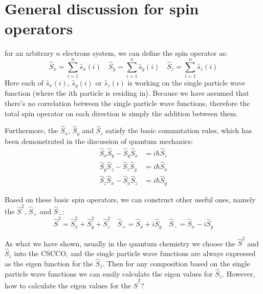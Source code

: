 \section{General discussion for spin operators}
%
%
%
for an arbitrary $n$ electrons system, we can define the spin
operator as:
\begin{equation}
  \hat{S}_{x} = \sum_{i=1}^{n}\hat{s}_{x}(i) \quad
  \hat{S}_{y} = \sum_{i=1}^{n}\hat{s}_{y}(i) \quad
  \hat{S}_{z} = \sum_{i=1}^{n}\hat{s}_{z}(i)
\end{equation}
Here each of $\hat{s}_{x}(i)$, $\hat{s}_{y}(i)$ or $\hat{s}_{z}(i)$
is working on the single particle wave function (where the ith
particle is residing in). Because we have assumed that there's no
correlation between the single particle wave functions, therefore
the total spin operator on each direction is simply the addition
between them.

Furthermore, the $\hat{S}_{x}$, $\hat{S}_{y}$ and $\hat{S}_{z}$
satisfy the basic commutation rules, which has been demonstrated in
the discussion of quantum mechanics:
\begin{align}\label{}
\hat{S}_{x}\hat{S}_{y} - \hat{S}_{y}\hat{S}_{x} &= i\hbar\hat{S}_{z}
\nonumber \\
\hat{S}_{y}\hat{S}_{z} - \hat{S}_{z}\hat{S}_{y} &= i\hbar\hat{S}_{x}
\nonumber \\
\hat{S}_{z}\hat{S}_{x} - \hat{S}_{x}\hat{S}_{z} &= i\hbar\hat{S}_{y}
\end{align}

Based on these basic spin operators, we can construct other useful
ones, namely the $\hat{S}^{2}$, $\hat{S}_{+}$ and $\hat{S}_{-}$:
\begin{equation}\label{}
\hat{S}^{2} = \hat{S}_{x}^{2} + \hat{S}_{y}^{2} + \hat{S}_{z}^{2}
\quad
\hat{S}_{+} = \hat{S}_{x} + i\hat{S}_{y} \quad
\hat{S}_{-}
=\hat{S}_{x} - i\hat{S}_{y}
\end{equation}

As what we have shown, usually in the quantum chemistry we choose
the $\hat{S}^{2}$ and $\hat{S}_{z}$ into the CSCCO, and the single
particle wave functions are always expressed as the eigen function
for the $\hat{S}_{z}$. Then for any composition based on the single
particle wave functions we can easily calculate the eigen values for
$\hat{S}_{z}$. However, how to calculate the eigen values for the
$\hat{S}^{2}$?

